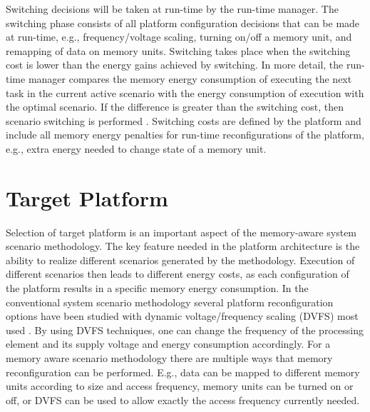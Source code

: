 Switching decisions will be taken at run-time by the run-time manager. The switching phase consists of all platform configuration decisions that can be made at run-time, e.g., frequency/voltage scaling, turning on/off a memory unit, and remapping of data on memory units. Switching takes place when the switching cost is lower than the energy gains achieved by switching. In more detail, the run-time manager compares the memory energy consumption of executing the next task in the current active scenario with the energy consumption of execution with the optimal scenario. If the difference is greater than the switching cost, then scenario switching is performed \cite{tcm}. Switching costs are defined by the platform and include all memory energy penalties for run-time reconfigurations of the platform, e.g., extra energy needed to change state of a memory unit.

\section{Target Platform}
\label{sec:platform}

Selection of target platform is an important aspect of the memory-aware system scenario methodology. The key feature needed in the platform architecture is the ability to realize different scenarios generated by the methodology. Execution of different scenarios then leads to different energy costs, as each configuration of the platform results in a specific memory energy consumption. In the conventional system scenario methodology several platform reconfiguration options have been studied \cite{Gheorghita2007} with dynamic voltage/frequency scaling (DVFS) most used \cite{dvfs}. By using DVFS techniques, one can change the frequency of the processing element and its supply voltage and energy consumption accordingly. For a memory aware scenario methodology there are multiple ways that memory reconfiguration can be performed. E.g., data can be mapped to different memory units according to size and access frequency, memory units can be turned on or off, or DVFS can be used to allow exactly the access frequency currently needed. 

